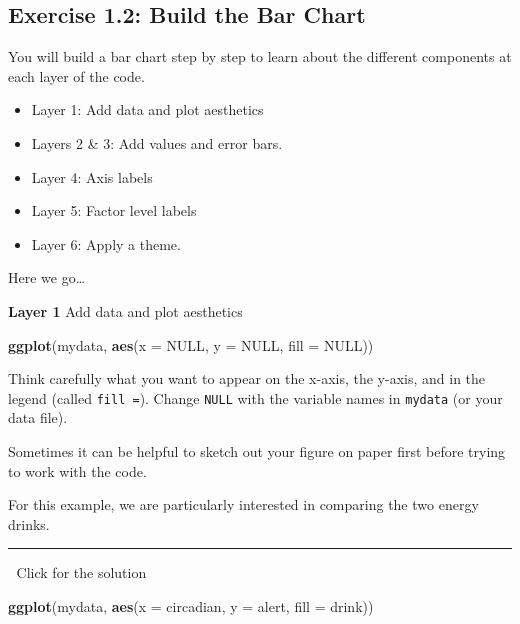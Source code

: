 \documentclass[
]{book}
\newenvironment{Shaded}{\begin{snugshade}}{\end{snugshade}}
\newcommand{\AttributeTok}[1]{\textcolor[rgb]{0.13,0.29,0.53}{#1}}
\newcommand{\ConstantTok}[1]{\textcolor[rgb]{0.56,0.35,0.01}{#1}}
\newcommand{\FunctionTok}[1]{\textcolor[rgb]{0.13,0.29,0.53}{\textbf{#1}}}
\newcommand{\NormalTok}[1]{#1}
\providecommand{\tightlist}{%
  \setlength{\itemsep}{0pt}\setlength{\parskip}{0pt}}
\let\oldsubsection\subsection
\renewcommand{\subsection}{\needspace{3\baselineskip}\oldsubsection}  %
\begin{document}
\subsection{Exercise 1.2: Build the Bar Chart}\label{exercise-1.2-build-the-bar-chart}

You will build a bar chart step by step to learn about the different components at each layer of the code.

\begin{itemize}
\tightlist
\item
  Layer 1: Add data and plot aesthetics
\item
  Layers 2 \& 3: Add values and error bars.
\item
  Layer 4: Axis labels
\item
  Layer 5: Factor level labels
\item
  Layer 6: Apply a theme.
\end{itemize}

Here we go\ldots{}

\textbf{Layer 1} Add data and plot aesthetics

\begin{Shaded}
\begin{Highlighting}[]
\FunctionTok{ggplot}\NormalTok{(mydata, }\FunctionTok{aes}\NormalTok{(}\AttributeTok{x =} \ConstantTok{NULL}\NormalTok{, }\AttributeTok{y =} \ConstantTok{NULL}\NormalTok{, }\AttributeTok{fill =} \ConstantTok{NULL}\NormalTok{))}
\end{Highlighting}
\end{Shaded}

Think carefully what you want to appear on the x-axis, the y-axis, and in the legend (called \texttt{fill\ =}). Change \texttt{NULL} with the variable names in \texttt{mydata} (or your data file).

Sometimes it can be helpful to sketch out your figure on paper first before trying to work with the code.

For this example, we are particularly interested in comparing the two energy drinks.

\begin{center}\rule{0.5\linewidth}{0.5pt}\end{center}

👀 Click for the solution

\begin{Shaded}
\begin{Highlighting}[]
\FunctionTok{ggplot}\NormalTok{(mydata, }\FunctionTok{aes}\NormalTok{(}\AttributeTok{x =}\NormalTok{ circadian, }\AttributeTok{y =}\NormalTok{ alert, }\AttributeTok{fill =}\NormalTok{ drink))}
\end{Highlighting}
\end{Shaded}
\end{document}

